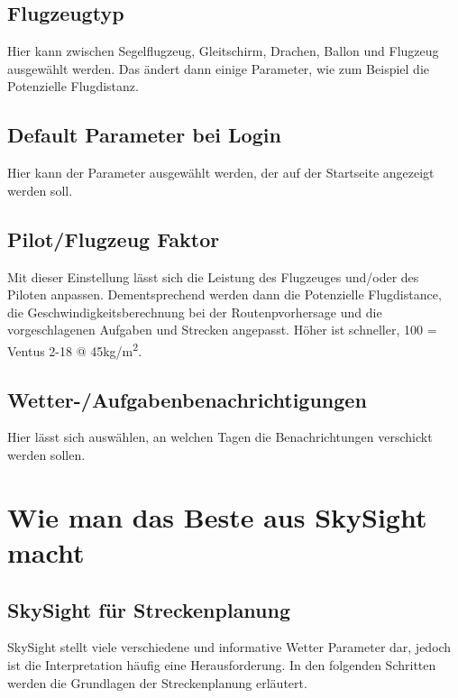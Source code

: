 \documentclass[11pt,a4paper]{article}
\begin{document}
\subsection{Flugzeugtyp}\label{subsec:aircraft_type}
Hier kann zwischen Segelflugzeug, Gleitschirm, Drachen, Ballon und Flugzeug ausgewählt werden. Das ändert dann einige Parameter, wie zum Beispiel die Potenzielle Flugdistanz.
\subsection{Default Parameter bei Login}
Hier kann der Parameter ausgewählt werden, der auf der Startseite angezeigt werden soll.
\subsection{Pilot/Flugzeug Faktor}\label{subsec:factor}
Mit dieser Einstellung lässt sich die Leistung des Flugzeuges und/oder des Piloten anpassen. Dementsprechend werden dann die Potenzielle Flugdistance, die Geschwindigkeitsberechnung bei der Routenpvorhersage und die vorgeschlagenen Aufgaben und Strecken angepasst. Höher ist schneller, 100 = Ventus 2-18 @ 45kg/m\textsuperscript{2}.
\subsection{Wetter-/Aufgabenbenachrichtigungen}
Hier lässt sich auswählen, an welchen Tagen die Benachrichtungen verschickt werden sollen.


\section{Wie man das Beste aus SkySight macht}
\subsection{SkySight für Streckenplanung} \label{subsec:taskplan}
SkySight stellt viele verschiedene und informative Wetter Parameter dar, jedoch ist die Interpretation häufig eine Herausforderung. In den folgenden Schritten werden die Grundlagen der Streckenplanung erläutert.
\end{document}
